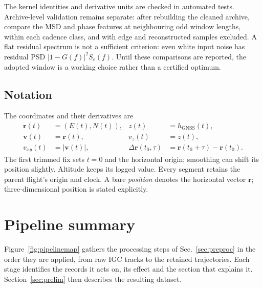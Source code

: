 The kernel identities and derivative units are checked in automated tests. Archive-level
validation remains separate: after rebuilding the cleaned archive, compare the MSD and
phase features at neighbouring odd window lengths, within each cadence class, and with
edge and reconstructed samples excluded. A flat residual spectrum is not a sufficient
criterion: even white input noise has residual PSD $|1-G(f)|^2S_\varepsilon(f)$.
Until these comparisons are reported, the adopted window is a working choice rather
than a certified optimum.

\subsection{Notation}
\label{sec:notation}
The coordinates and their derivatives are
\begin{align*}
 \mathbf r(t)&=(E(t),N(t)), & z(t)&=h_{\mathrm{GNSS}}(t),\\
 \mathbf v(t)&=\dot{\mathbf r}(t), & v_z(t)&=\dot z(t),\\
 v_{xy}(t)&=|\mathbf v(t)|, &
 \Delta\mathbf r(t_0,\tau)&=\mathbf r(t_0+\tau)-\mathbf r(t_0).
\end{align*}
The first trimmed fix sets $t=0$ and the horizontal origin; smoothing can shift
its position slightly. Altitude keeps its logged value. Every segment retains the
parent flight's origin and clock. A bare \emph{position} denotes the horizontal
vector $\mathbf r$; three-dimensional position is stated explicitly.

\FloatBarrier


\section{Pipeline summary}
\label{sec:pipelinemap}

Figure~\ref{fig:pipelinemap} gathers the processing steps of
Sec.~\ref{sec:preproc} in the order they are applied, from raw IGC tracks to the
retained trajectories. Each stage identifies the records it acts on, its effect and
the section that explains it. Section~\ref{sec:prelim} then describes the resulting
dataset.

